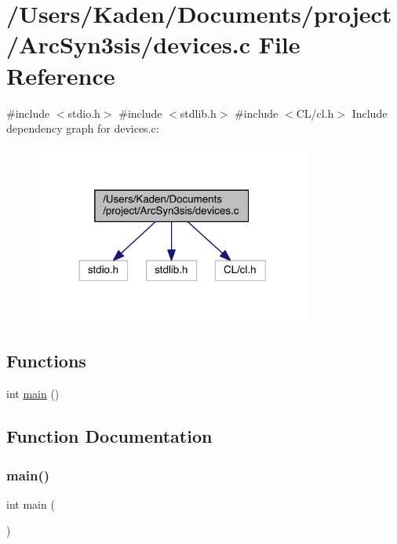 \hypertarget{a00443}{}\section{/\+Users/\+Kaden/\+Documents/project/\+Arc\+Syn3sis/devices.c File Reference}
\label{a00443}
{\ttfamily \#include $<$stdio.\+h$>$}\newline
{\ttfamily \#include $<$stdlib.\+h$>$}\newline
{\ttfamily \#include $<$C\+L/cl.\+h$>$}\newline
Include dependency graph for devices.\+c\+:\nopagebreak
\begin{figure}[H]
\begin{center}
\leavevmode
\includegraphics[width=258pt]{a00444}
\end{center}
\end{figure}
\subsection*{Functions}
\begin{DoxyCompactItemize}
\item 
int \hyperlink{a00443_ae66f6b31b5ad750f1fe042a706a4e3d4}{main} ()
\end{DoxyCompactItemize}


\subsection{Function Documentation}
\mbox{\label{a00443_ae66f6b31b5ad750f1fe042a706a4e3d4}} 
\subsubsection{\texorpdfstring{main()}{main()}}
{\footnotesize\ttfamily int main (\begin{DoxyParamCaption}{ }\end{DoxyParamCaption})}


